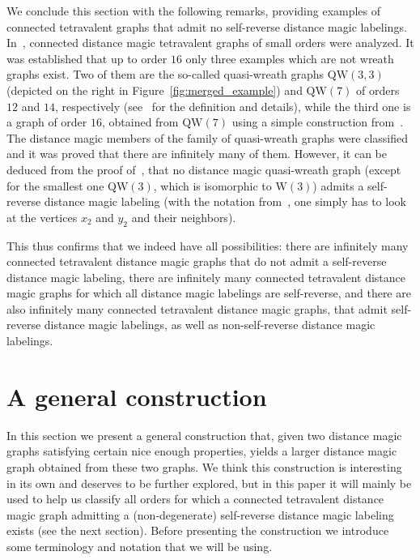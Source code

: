 \documentclass[11 pt,english]{article}
\theoremstyle{definition}
\begin{document}
We conclude this section with the following remarks, providing examples of connected tetravalent graphs that admit no self-reverse distance magic labelings. In~\cite{RozSpa25}, connected distance magic tetravalent graphs of small orders were analyzed. It was established that up to order $16$ only three examples which are not wreath graphs exist. Two of them are the so-called quasi-wreath graphs $\mathrm{QW}(3,3)$ (depicted on the right in Figure~\ref{fig:merged_example}) and $\mathrm{QW}(7)$ of orders $12$ and $14$, respectively (see~\cite{RozSpa25} for the definition and details), while the third one is a graph of order $16$, obtained from $\mathrm{QW}(7)$ using a simple construction from~\cite{KovFroKov12}. The distance magic members of the family of quasi-wreath graphs were classified and it was proved that there are infinitely many of them. However, it can be deduced from the proof of~\cite[Proposition~4.3]{RozSpa25}, that no distance magic quasi-wreath graph (except for the smallest one $\mathrm{QW}(3)$, which is isomorphic to $\mathrm{W}(3)$) admits a self-reverse distance magic labeling (with the notation from~\cite{RozSpa25}, one simply has to look at the vertices $x_2$ and $y_2$ and their neighbors). 

This thus confirms that we indeed have all possibilities: there are infinitely many connected tetravalent distance magic graphs that do not admit a self-reverse distance magic labeling, there are infinitely many connected tetravalent distance magic graphs for which all distance magic labelings are self-reverse, and there are also infinitely many connected tetravalent distance magic graphs, that admit self-reverse distance magic labelings, as well as non-self-reverse distance magic labelings.



\section{A general construction}
\label{sec:construction}

In this section we present a general construction that, given two distance magic graphs satisfying certain nice enough properties, yields a larger distance magic graph obtained from these two graphs. We think this construction is interesting in its own and deserves to be further explored, but in this paper it will mainly be used to help us classify all orders for which a connected tetravalent distance magic graph admitting a (non-degenerate) self-reverse distance magic labeling exists (see the next section).
Before presenting the construction we introduce some terminology and notation that we will be using. 
\end{document}
